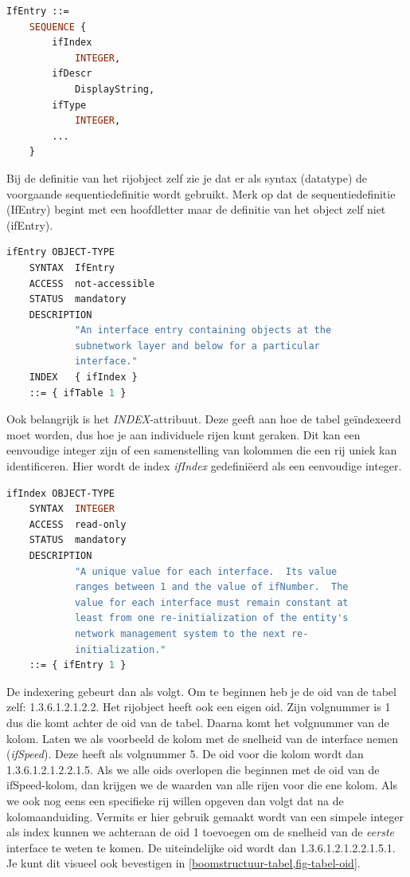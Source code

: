 \begin{lstlisting}[language=asn.1, float=h, caption={Sequentiedefinitie voor een tabelrij}, label=definitie-sequentie-rij]
IfEntry ::=
	SEQUENCE {
		ifIndex
			INTEGER,
		ifDescr
			DisplayString,
		ifType
			INTEGER,
		...
	}
\end{lstlisting}

Bij de definitie van het rijobject zelf zie je dat er als syntax (datatype) de voorgaande sequentiedefinitie wordt gebruikt.
Merk op dat de sequentiedefinitie (IfEntry) begint met een hoofdletter maar de definitie van het object zelf niet (ifEntry).

\begin{lstlisting}[language=asn.1, float=h, caption={Definitie van een rijobject}, label=definitie-rijobject]
ifEntry OBJECT-TYPE
	SYNTAX	IfEntry
	ACCESS	not-accessible
	STATUS	mandatory
	DESCRIPTION
			"An interface entry containing objects at the
			subnetwork layer and below for a particular
			interface."
	INDEX	{ ifIndex }
	::= { ifTable 1 }
\end{lstlisting}

Ook belangrijk is het \textit{INDEX}-attribuut. Deze geeft aan hoe de tabel geïndexeerd moet worden, dus hoe je aan individuele rijen kunt geraken.
Dit kan een eenvoudige integer zijn of een samenstelling van kolommen die een rij uniek kan identificeren.
Hier wordt de index \textit{ifIndex} gedefiniëerd als een eenvoudige integer.

\begin{lstlisting}[language=asn.1, float=h, caption={Definitie van ifIndex}, label=definitie-ifindex]
ifIndex OBJECT-TYPE
	SYNTAX	INTEGER
	ACCESS	read-only
	STATUS	mandatory
	DESCRIPTION
			"A unique value for each interface.  Its value
			ranges between 1 and the value of ifNumber.  The
			value for each interface must remain constant at
			least from one re-initialization of the entity's
			network management system to the next re-
			initialization."
	::= { ifEntry 1 }
\end{lstlisting}

De indexering gebeurt dan als volgt. Om te beginnen heb je de \gls{oid} van de tabel zelf: 1.3.6.1.2.1.2.2.
Het rijobject heeft ook een eigen \gls{oid}. Zijn volgnummer is 1 dus die komt achter de \gls{oid} van de tabel.
Daarna komt het volgnummer van de kolom. Laten we als voorbeeld de kolom met de snelheid van de interface nemen (\textit{ifSpeed}).
Deze heeft als volgnummer 5. De \gls{oid} voor die kolom wordt dan 1.3.6.1.2.1.2.2.1.5.
Als we alle \glspl{oid} overlopen die beginnen met de \gls{oid} van de ifSpeed-kolom, dan krijgen we de waarden van alle rijen voor die ene kolom.
Als we ook nog eens een specifieke rij willen opgeven dan volgt dat na de kolomaanduiding.
Vermits er hier gebruik gemaakt wordt van een simpele integer als index kunnen we achteraan de \gls{oid} 1 toevoegen om 
de snelheid van de \emph{eerste} interface te weten te komen. De uiteindelijke \gls{oid} wordt dan 1.3.6.1.2.1.2.2.1.5.1.
Je kunt dit visueel ook bevestigen in \cref{boomstructuur-tabel,fig-tabel-oid}.

